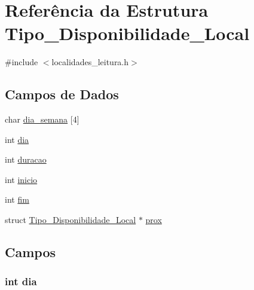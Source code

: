 \hypertarget{struct_tipo___disponibilidade___local}{}\section{Referência da Estrutura Tipo\+\_\+\+Disponibilidade\+\_\+\+Local}
\label{struct_tipo___disponibilidade___local}


{\ttfamily \#include $<$localidades\+\_\+leitura.\+h$>$}

\subsection*{Campos de Dados}
\begin{DoxyCompactItemize}
\item 
char \hyperlink{struct_tipo___disponibilidade___local_a323a88f87a558147bdcf9356fcbb6ee8}{dia\+\_\+semana} \mbox{[}4\mbox{]}
\item 
int \hyperlink{struct_tipo___disponibilidade___local_a3d1171ac670a8e8a672c481f22d1fa9f}{dia}
\item 
int \hyperlink{struct_tipo___disponibilidade___local_a5ff720c55f82e01378e85d9f7ac93afa}{duracao}
\item 
int \hyperlink{struct_tipo___disponibilidade___local_a73f53b0349bb995757a60c9c0bde3569}{inicio}
\item 
int \hyperlink{struct_tipo___disponibilidade___local_a22be39504679a934aea082c76c95bb68}{fim}
\item 
struct \hyperlink{struct_tipo___disponibilidade___local}{Tipo\+\_\+\+Disponibilidade\+\_\+\+Local} $\ast$ \hyperlink{struct_tipo___disponibilidade___local_ae62f583754f4620bf63298d1bb19dfbb}{prox}
\end{DoxyCompactItemize}


\subsection{Campos}
\hypertarget{struct_tipo___disponibilidade___local_a3d1171ac670a8e8a672c481f22d1fa9f}{}
\subsubsection[{dia}]{\setlength{\rightskip}{0pt plus 5cm}int dia}\label{struct_tipo___disponibilidade___local_a3d1171ac670a8e8a672c481f22d1fa9f}
\hypertarget{struct_tipo___disponibilidade___local_a323a88f87a558147bdcf9356fcbb6ee8}{}

